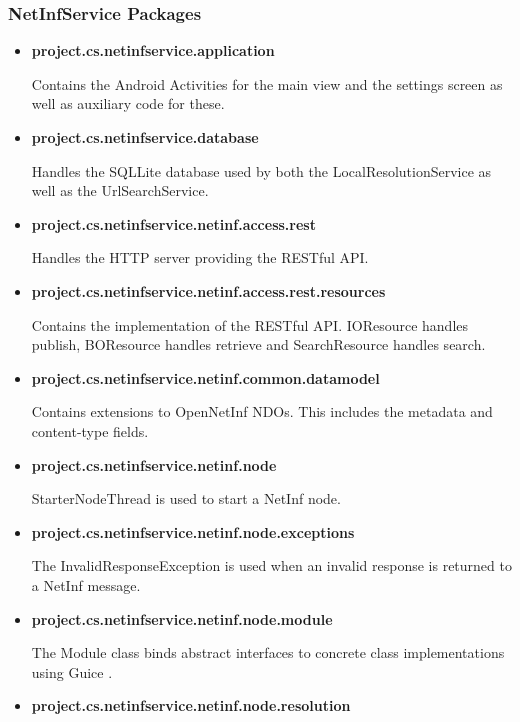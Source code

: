 \subsubsection{NetInfService Packages}

\begin{itemize}
	\item{\bf project.cs.netinfservice.application}
	
	Contains the Android Activities for the main view and the settings screen as well as auxiliary code for these.	
	
	\item{\bf project.cs.netinfservice.database}
	
	Handles the SQLLite database used by both the LocalResolutionService as well as the UrlSearchService.	
	
	\item{\bf project.cs.netinfservice.netinf.access.rest}
	
	Handles the HTTP server providing the RESTful API.
	
	\item{\bf project.cs.netinfservice.netinf.access.rest.resources}	
	
	Contains the implementation of the RESTful API. IOResource handles publish, BOResource handles retrieve and SearchResource handles search.
	
	\item{\bf project.cs.netinfservice.netinf.common.datamodel}
	
	Contains extensions to OpenNetInf NDOs. This includes the metadata and content-type fields.
	
	\item{\bf project.cs.netinfservice.netinf.node}
	
	StarterNodeThread is used to start a NetInf node.	

	\item{\bf project.cs.netinfservice.netinf.node.exceptions}

	The InvalidResponseException is used when an invalid response is returned to a NetInf message.
	
	\item{\bf project.cs.netinfservice.netinf.node.module}
	
	The Module class binds abstract interfaces to concrete class implementations using Guice \cite{guice}.
	
	\item{\bf project.cs.netinfservice.netinf.node.resolution}
	

\end{itemize}
